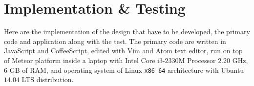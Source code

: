 \chapter{Implementation \& Testing}
\label{chap:implementation-testing}

Here are the implementation of the design that have to be developed, the primary code and application along with the test.
The primary code are written in JavaScript and CoffeeScript, edited with Vim and Atom text editor, run on top of Meteor platform inside a laptop with Intel Core i3-$2330$M Processor $2.20$ GHz, $6$ GB of RAM, and operating system of Linux \verb|x86_64| architecture with Ubuntu $14.04$ LTS distribution.
